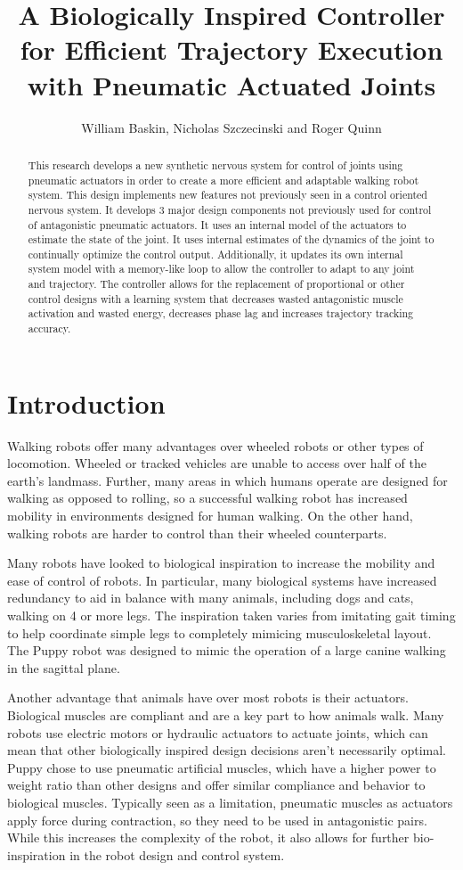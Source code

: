 \documentclass[letterpaper, 10 pt, conference]{IEEEconf} %
\author{William Baskin, Nicholas Szczecinski and Roger Quinn}
\title{
  {A Biologically Inspired Controller for Efficient Trajectory Execution with Pneumatic Actuated Joints}\\
}
\newcommand{\bbs}[1]{\section{#1}}
\begin{document}
\maketitle

\begin{abstract}
\label{chap:abstract}
This research develops a new synthetic nervous system for control of joints using pneumatic actuators in order to create a more efficient and adaptable walking robot system. This design implements new features not previously seen in a control oriented nervous system. It develops 3 major design components not previously used for control of antagonistic pneumatic actuators. It uses an internal model of the actuators to estimate the state of the joint. It uses internal estimates of the dynamics of the joint to continually optimize the control output. Additionally, it updates its own internal system model with a memory-like loop to allow the controller to adapt to any joint and trajectory. The controller allows for the replacement of proportional or other control designs with a learning system that decreases wasted antagonistic muscle activation and wasted energy, decreases phase lag and increases trajectory tracking accuracy.
\end{abstract}

\bbs{Introduction} %
\label{chap:introduction}

Walking robots offer many advantages over wheeled robots or other types
of locomotion. Wheeled or tracked vehicles are unable to access over half
of the earth's landmass. \cite{BigDog} Further, many areas in which humans
operate are designed for walking as opposed to rolling, so a successful walking 
robot has increased mobility in environments designed for human walking. On the
other hand, walking robots are harder to control than their wheeled 
counterparts.

Many robots have looked to biological inspiration to increase the mobility and
ease of control of robots. In particular, many biological systems have increased
redundancy to aid in balance with many animals, including dogs and cats, walking
on 4 or more legs. The inspiration taken varies from imitating gait timing to
help coordinate simple legs to completely mimicing musculoskeletal layout. The
Puppy robot was designed to mimic the operation of a large canine walking in
the sagittal plane. \cite{PuppyDesign}

Another advantage that animals have over most robots is their actuators.
Biological muscles are compliant and are a key part to how animals walk. Many
robots use electric motors or hydraulic actuators to actuate joints, which can
mean that other biologically inspired design decisions aren't necessarily 
optimal. Puppy chose to use pneumatic artificial muscles, which have a higher
power to weight ratio than other designs and offer similar compliance and
behavior to biological muscles. \cite{Tavakoli2008} Typically seen as a 
limitation, pneumatic muscles as actuators apply force during contraction, so 
they need to be used in antagonistic pairs. While this increases the complexity
of the robot, it also allows for further bio-inspiration in the robot design
and control system.
\end{document}
